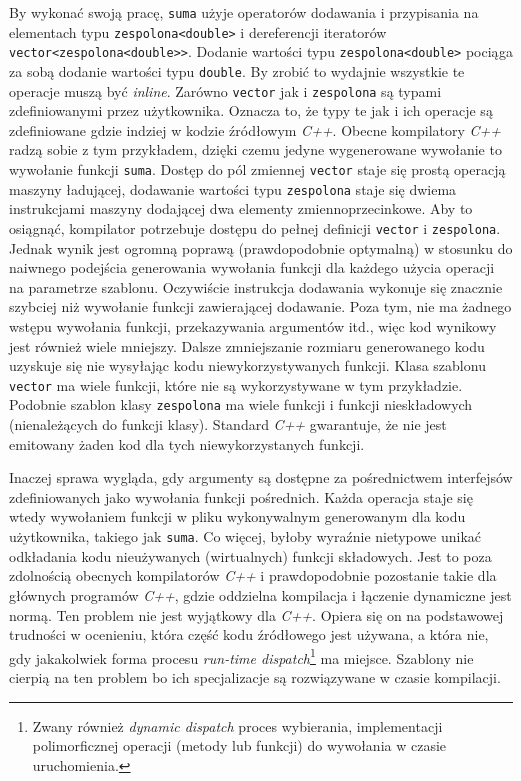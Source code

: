 \documentclass[11pt, a4paper]{article}
\begin{document}
By wykonać swoją pracę, \verb#suma# użyje operatorów dodawania i przypisania na elementach typu \verb#zespolona<double># i dereferencji iteratorów \verb#vector<zespolona<double>>#.  Dodanie wartości typu \verb#zespolona<double># pociąga za sobą dodanie wartości typu \verb#double#. By zrobić to wydajnie wszystkie te operacje muszą być \emph{inline}.  Zarówno \verb#vector# jak i \verb#zespolona# są typami zdefiniowanymi przez użytkownika. Oznacza to, że typy te jak i ich operacje są zdefiniowane gdzie indziej w kodzie źródłowym \emph{C++}. Obecne kompilatory \emph{C++} radzą sobie z tym przykładem, dzięki czemu jedyne wygenerowane wywołanie to wywołanie funkcji \verb#suma#. Dostęp do pól zmiennej \verb#vector# staje się prostą operacją maszyny ładującej, dodawanie wartości typu \verb#zespolona# staje się dwiema instrukcjami maszyny dodającej dwa elementy zmiennoprzecinkowe. Aby to osiągnąć, kompilator potrzebuje dostępu do pełnej definicji \verb#vector# i \verb#zespolona#. Jednak wynik jest ogromną poprawą (prawdopodobnie optymalną) w stosunku do naiwnego podejścia generowania wywołania funkcji dla każdego użycia operacji na parametrze szablonu. Oczywiście instrukcja dodawania wykonuje się znacznie szybciej niż wywołanie funkcji zawierającej dodawanie. Poza tym, nie ma żadnego wstępu wywołania funkcji, przekazywania argumentów itd., więc kod wynikowy jest również wiele mniejszy. Dalsze zmniejszanie rozmiaru generowanego kodu uzyskuje się nie wysyłając kodu niewykorzystywanych funkcji. Klasa szablonu \verb#vector# ma wiele funkcji, które nie są wykorzystywane w tym przykładzie. Podobnie szablon klasy \verb#zespolona# ma wiele funkcji i funkcji nieskładowych (nienależących do funkcji klasy). Standard \emph{C++} gwarantuje, że nie jest emitowany żaden kod dla tych niewykorzystanych funkcji. 

Inaczej sprawa wygląda, gdy argumenty są dostępne za pośrednictwem interfejsów zdefiniowanych jako wywołania funkcji pośrednich. Każda operacja staje się wtedy wywołaniem funkcji w pliku wykonywalnym generowanym dla kodu użytkownika, takiego jak \verb#suma#. Co więcej, byłoby wyraźnie nietypowe unikać odkładania kodu nieużywanych (wirtualnych) funkcji składowych. Jest to poza zdolnością obecnych kompilatorów \emph{C++} i prawdopodobnie pozostanie takie dla głównych programów \emph{C++}, gdzie oddzielna kompilacja i łączenie dynamiczne jest normą. Ten problem nie jest wyjątkowy dla \emph{C++}. Opiera się on na podstawowej trudności w ocenieniu, która część kodu źródłowego jest używana, a która nie, gdy jakakolwiek forma procesu \emph{run-time dispatch}\footnote{Zwany również \emph{dynamic dispatch} proces wybierania, implementacji polimorficznej operacji (metody lub funkcji) do wywołania w czasie uruchomienia.} ma miejsce. Szablony nie cierpią na ten problem bo ich specjalizacje są rozwiązywane w czasie kompilacji.\newline
\end{document}
